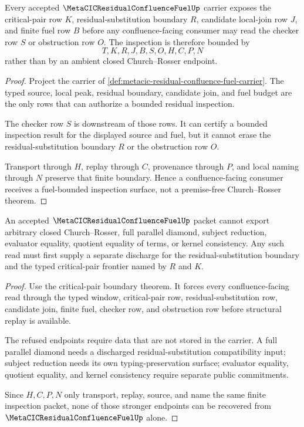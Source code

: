 \begin{theorem}
\label{thm:metacic-residual-confluence-fuel-critical-pair}
Every accepted $\MetaCICResidualConfluenceFuelUp$ carrier exposes the critical-pair row $K$, residual-substitution boundary $R$, candidate local-join row $J$, and finite fuel row $B$ before any confluence-facing consumer may read the checker row $S$ or obstruction row $O$. The inspection is therefore bounded by
$$
T,K,R,J,B,S,O,H,C,P,N
$$
rather than by an ambient closed Church--Rosser endpoint.
\end{theorem}
\begin{proof}
Project the carrier of \autoref{def:metacic-residual-confluence-fuel-carrier}. The typed source, local peak, residual boundary, candidate join, and fuel budget are the only rows that can authorize a bounded residual inspection.

The checker row $S$ is downstream of those rows. It can certify a bounded inspection result for the displayed source and fuel, but it cannot erase the residual-substitution boundary $R$ or the obstruction row $O$.

Transport through $H$, replay through $C$, provenance through $P$, and local naming through $N$ preserve that finite boundary. Hence a confluence-facing consumer receives a fuel-bounded inspection surface, not a premise-free Church--Rosser theorem.
\end{proof}

\begin{theorem}
\label{thm:metacic-residual-confluence-fuel-non-escape}
An accepted $\MetaCICResidualConfluenceFuelUp$ packet cannot export arbitrary closed Church--Rosser, full parallel diamond, subject reduction, evaluator equality, quotient equality of terms, or kernel consistency. Any such read must first supply a separate discharge for the residual-substitution boundary and the typed critical-pair frontier named by $R$ and $K$.
\end{theorem}
\begin{proof}
Use the critical-pair boundary theorem. It forces every confluence-facing read through the typed window, critical-pair row, residual-substitution row, candidate join, finite fuel, checker row, and obstruction row before structural replay is available.

The refused endpoints require data that are not stored in the carrier. A full parallel diamond needs a discharged residual-substitution compatibility input; subject reduction needs its own typing-preservation surface; evaluator equality, quotient equality, and kernel consistency require separate public commitments.

Since $H,C,P,N$ only transport, replay, source, and name the same finite inspection packet, none of those stronger endpoints can be recovered from $\MetaCICResidualConfluenceFuelUp$ alone.
\end{proof}

